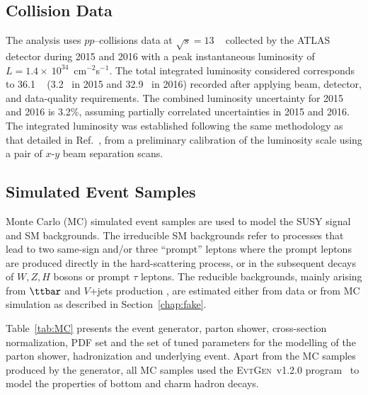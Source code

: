\subsection{Collision Data}
The analysis uses $pp$--collisions data at $\sqrt s=13$ \TeV~ 
collected by the ATLAS detector during 2015 and 2016
 with a peak instantaneous luminosity of 
$L=1.4\times~10^{34}$~cm$^{-2}$s$^{-1}$.
The total integrated luminosity considered corresponds to 36.1 \ifb~ 
(3.2 \ifb~in 2015 and 32.9 \ifb~in 2016) recorded 
after applying beam, detector, and data-quality requirements.
The combined luminosity uncertainty for 2015 and 2016 is 3.2\%, 
assuming partially correlated uncertainties in 2015 and 2016.
The integrated luminosity was established following the same methodology as 
that detailed in Ref.~\cite{Aaboud:2016hhf},
from a preliminary calibration of the luminosity scale using a pair of $x$-$y$ 
beam separation scans.%

\subsection{Simulated Event Samples}

Monte Carlo (MC) simulated event samples are used to model the SUSY signal 
and SM backgrounds. 
The irreducible SM backgrounds refer to processes that lead to two 
same-sign and/or three ``prompt'' leptons where the prompt leptons
are produced directly in the hard-scattering process, 
or in the subsequent decays 
of $W,Z,H$ bosons or prompt $\tau$ leptons. 
The reducible backgrounds, mainly 
arising from $\ttbar$ and $V$+jets production , are estimated either from data 
or from MC simulation as described in Section~\ref{chap:fake}. 

Table~\ref{tab:MC} presents the event generator, parton shower, cross-section 
normalization, PDF
set and the set of tuned parameters for the modelling of the parton shower, 
hadronization and underlying event. 
Apart from the MC samples produced by the \SHERPA generator, all MC samples
used the \textsc{EvtGen}~v1.2.0 program~\cite{EvtGen} 
to model the properties of bottom and charm hadron decays. 

